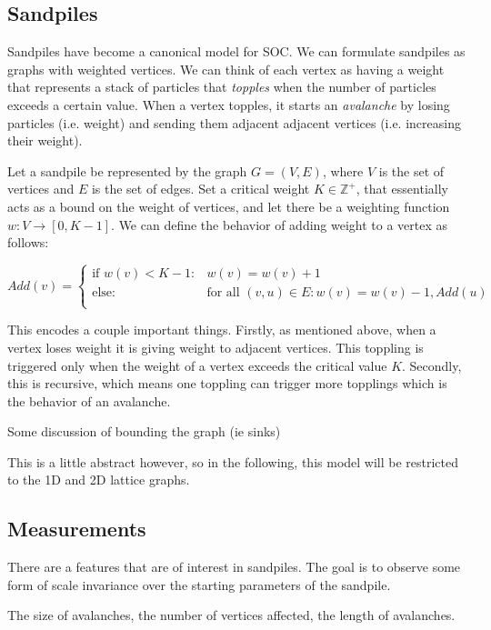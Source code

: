 \documentclass{article}
\begin{document}
\subsection{Sandpiles}
Sandpiles have become a canonical model for SOC. We can formulate sandpiles as graphs with weighted vertices. We can think of each vertex as having a weight that represents a stack of particles that \textit{topples} when the number of particles exceeds a certain value. When a vertex topples, it starts an \textit{avalanche} by losing particles (i.e. weight) and sending them adjacent adjacent vertices (i.e. increasing their weight).

Let a sandpile be represented by the graph $G=(V,E)$, where $V$ is the set of vertices and $E$ is the set of edges. Set a critical weight $K \in \mathbb{Z}^+$, that essentially acts as a bound on the weight of vertices, and let there be a weighting function $w:V \rightarrow [0,K-1]$. We can define the behavior of adding weight to a vertex as follows:

\begin{equation}
Add(v) =
\begin{cases}
\text{if }w(v) < K-1: & w(v) = w(v) + 1\\
\text{else: }&
\text{for all } (v,u)\in E: 
w(v) = w(v) - 1, Add(u)\\
\end{cases}
\end{equation}

This encodes a couple important things. Firstly, as mentioned above, when a vertex loses weight it is giving weight to adjacent vertices. This toppling is triggered only when the weight of a vertex exceeds the critical value $K$. Secondly, this is recursive, which means one toppling can trigger more topplings which is the behavior of an avalanche. 

Some discussion of bounding the graph (ie sinks)

This is a little abstract however, so in the following, this model will be restricted to the 1D and 2D lattice graphs. 


\subsection{Measurements}
There are a features that are of interest in sandpiles. The goal is to observe some form of scale invariance over the starting parameters of the sandpile. 

The size of avalanches, the number of vertices affected, the length of avalanches. 
\end{document}
